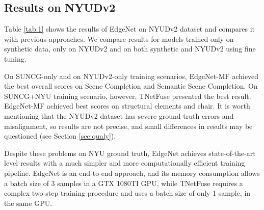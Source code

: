 \subsection{Results on NYUDv2}

Table \ref{tab:1} shows the results of EdgeNet on NYUDv2 dataset and compares it with previous approaches. We compare results for models trained only on synthetic data, only on NYUDv2 and on both synthetic and NYUDv2 using fine tuning. 


On SUNCG-only and on NYUDv2-only training scenarios, EdgeNet-MF achieved the best overall scores on Scene Completion and Semantic Scene Completion. On SUNCG+NYU training scenario, however, TNetFuse presented the best result. EdgeNet-MF achieved best scores on structural elements and chair. It is worth mentioning that the NYUDv2 dataset  has severe ground truth errors and misalignment, so results are not precise, and small differences in results may be questioned (see Section \ref{sec:qualy}).

Despite these problems on NYU ground truth, EdgeNet achieves state-of-the-art level results with a much simpler and more computationally efficient training pipeline. EdgeNet is an end-to-end approach, and its memory consumption allows a batch size of 3 samples in a GTX 1080TI GPU, while TNetFuse requires a complex two step training procedure and uses a batch size of only 1 sample, in the same GPU. 


